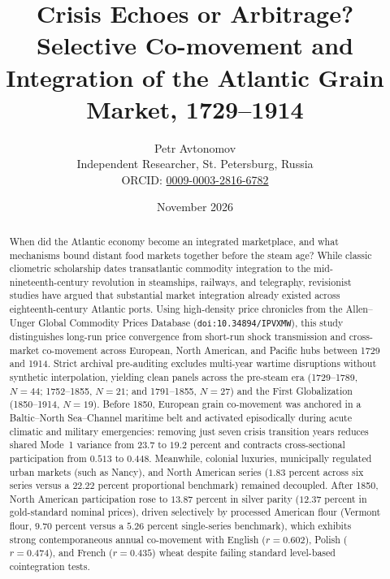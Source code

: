 \documentclass{article}
\title{\textbf{Crisis Echoes or Arbitrage? Selective Co-movement and Integration of the Atlantic Grain Market, 1729--1914}}
\author{Petr Avtonomov\\
\small Independent Researcher, St. Petersburg, Russia\\
\small ORCID: \href{https://orcid.org}{0009-0003-2816-6782}}
\date{November 2026}
\begin{document}
\sloppy

\maketitle

\begin{abstract}
When did the Atlantic economy become an integrated marketplace, and what mechanisms bound distant food markets together before the steam age? While classic cliometric scholarship dates transatlantic commodity integration to the mid-nineteenth-century revolution in steamships, railways, and telegraphy, revisionist studies have argued that substantial market integration already existed across eighteenth-century Atlantic ports. Using high-density price chronicles from the Allen--Unger Global Commodity Prices Database (\texttt{doi:10.34894/IPVXMW}), this study distinguishes long-run price convergence from short-run shock transmission and cross-market co-movement across European, North American, and Pacific hubs between 1729 and 1914. Strict archival pre-auditing excludes multi-year wartime disruptions without synthetic interpolation, yielding clean panels across the pre-steam era (1729--1789, $N=44$; 1752--1855, $N=21$; and 1791--1855, $N=27$) and the First Globalization (1850--1914, $N=19$). Before 1850, European grain co-movement was anchored in a Baltic--North Sea--Channel maritime belt and activated episodically during acute climatic and military emergencies: removing just seven crisis transition years reduces shared Mode~1 variance from $23.7$ to $19.2$ percent and contracts cross-sectional participation from $0.513$ to $0.448$. Meanwhile, colonial luxuries, municipally regulated urban markets (such as Nancy), and North American series ($1.83$ percent across six series versus a $22.22$ percent proportional benchmark) remained decoupled. After 1850, North American participation rose to $13.87$ percent in silver parity ($12.37$ percent in gold-standard nominal prices), driven selectively by processed American flour (Vermont flour, $9.70$ percent versus a $5.26$ percent single-series benchmark), which exhibits strong contemporaneous annual co-movement with English ($r = 0.602$), Polish ($r = 0.474$), and French ($r = 0.435$) wheat despite failing standard level-based cointegration tests.
\end{abstract}
\end{document}
